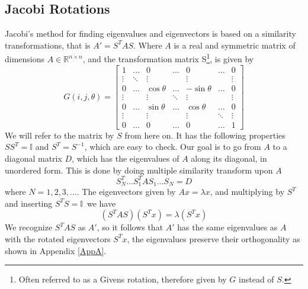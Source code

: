 \documentclass[%
reprint,
nofootinbib,
amsmath,amssymb,
aps,
]{revtex4-1}
\begin{document}
\subsection{Jacobi Rotations}\label{jr} %
Jacobi's method for finding eigenvalues and eigenvectors is based on a similarity transformations, that is $A' = S^TAS$. Where $A$ is a real and symmetric matrix of dimensions $A\in \mathbb{R}^{n\times n}$, and the transformation matrix S\footnote{Often referred to as a Givens rotation\cite{stewart2001matrix}, therefore given by $G$ instead of $S$.},  is given by
\begin{equation}
    \label{eqn:givens}
G(i, j, \theta) = 
\begin{bmatrix}
	1 & \dots & 0 & \dots & 0 & \dots & 0 \\
	\vdots & \ddots & \vdots & & \vdots & & \vdots \\
	0 &\dots & \cos\theta & \dots  & - \sin \theta & \dots & 0 \\
	\vdots && \vdots & \ddots & \vdots && \vdots \\
	0 & \dots & \sin \theta & \dots & \cos \theta & \dots & 0 \\
	\vdots && \vdots && \vdots & \ddots & \vdots \\
	0 & \dots & 0 & \dots & 0 & \dots & 1
\end{bmatrix}
\end{equation}
We will refer to the matrix by $S$ from here on. It has the following properties $SS^T = \mathbb{I}$ and $S^T = S^{-1}$, which are easy to check. Our goal is to go from $A$ to a diagonal matrix $D$, which has the eigenvalues of $A$ along its diagonal, in unordered form. This is done by doing multiple similarity transform upon $A$
\begin{equation}
	S_N^T\dots S_1^TAS_1\dots S_N = D
\end{equation}
where $N = 1,2,3,\dots$.
The eigenvectors given by $Ax = \lambda x$, and multiplying by $S^T$ and inserting $S^TS = \mathbb{I}$ we have 
\begin{equation}
	(S^TAS)(S^Tx) = \lambda (S^Tx)
\end{equation}
We recognize $S^TAS$ as $A'$, so it follows that $A'$ has the same eigenvalues as $A$ with the rotated eigenvectors $S^Tx$, the eigenvalues preserve their orthogonality as shown in Appendix \ref{AppA}.
\end{document}
